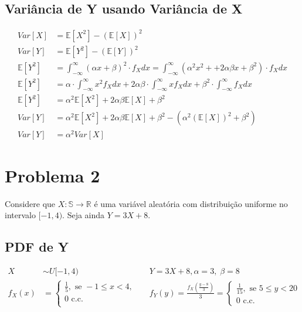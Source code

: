 \documentclass{article}
\begin{document}
\subsection{Variância de Y usando Variância de X}
\begin{align*}
    Var[X] &= \mathbb{E}[X^2] -(\mathbb{E}[X])^2 \\
    Var[Y] &= \mathbb{E}[Y^2] -(\mathbb{E}[Y])^2 \\
    \mathbb{E}[Y^2] &= \int_{-\infty}^{\infty} (\alpha x + \beta)^2 \cdot f_X dx =
    \int_{-\infty}^{\infty} (\alpha^2 x^2 + + 2 \alpha \beta x + \beta^2) \cdot f_X dx \\
    \mathbb{E}[Y^2] &= \alpha\cdot\int_{-\infty}^{\infty} x^2 f_X dx + 2 \alpha \beta \cdot
    \int_{-\infty}^{\infty} x f_X dx + \beta^2 \cdot \int_{-\infty}^{\infty} f_X dx \\
    \mathbb{E}[Y^2] &= \alpha^2 \mathbb{E}[X^2] + 2 \alpha \beta \mathbb{E}[X] + \beta^2 \\
    Var[Y] &= \alpha^2 \mathbb{E}[X^2] + 2 \alpha \beta \mathbb{E}[X] + \beta^2 - (\alpha^2
    (\mathbb{E}[X])^2 + \beta^2) \\
    Var[Y] &= \alpha^2 Var[X]
\end{align*}

\section{Problema 2}
Considere que $X: \mathbb{S} \to \mathbb{R}$ é uma variável aleatória com distribuição uniforme no
intervalo $[-1,4)$. Seja ainda $Y = 3 X + 8$.

\subsection{PDF de Y}
\begin{align*}
    X &\sim U [-1,4) && Y = 3 X + 8, \alpha=3, \; \beta=8 \\
    f_X(x) &=
    \begin{cases}
        \frac{1}{5}, \text{ se } -1 \leq x < 4, \\
        0 \text{ c.c.} \\
    \end{cases}&&
f_Y(y) = \frac{f_X\left(\frac{y-8}{3}\right)}{3} =
    \begin{cases}
        \frac{1}{15}, \text{ se } 5 \leq y < 20\\
        0 \text{ c.c.}
    \end{cases}
\end{align*}
\end{document}

